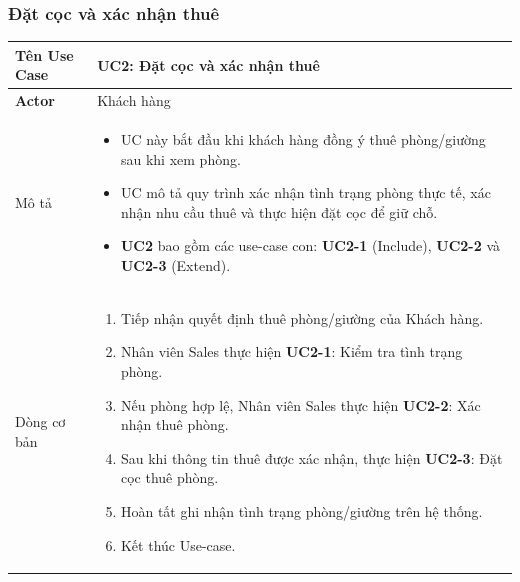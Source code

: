 \subsubsection{Đặt cọc và xác nhận thuê}
\noindent
\begin{table}[H]
    \centering
\begin{tabularx}{\textwidth}{|>{\centering\arraybackslash\bfseries}m{3.5cm}|X|}
    \hline
    Tên Use Case & {\centering\textbf{UC2: Đặt cọc và xác nhận thuê}\par} \\ 
    \hline
    
    Actor & Khách hàng \\ 
    \hline

    Mô tả &
    \vspace{0.2cm}
    \begin{itemize}[leftmargin=*, nosep, label=-]
        \item UC này bắt đầu khi khách hàng đồng ý thuê phòng/giường sau khi xem phòng.
        \item UC mô tả quy trình xác nhận tình trạng phòng thực tế, xác nhận nhu cầu thuê và thực hiện đặt cọc để giữ chỗ.
        \item \textbf{UC2} bao gồm các use-case con: \textbf{UC2-1} (Include), \textbf{UC2-2} và \textbf{UC2-3} (Extend).
    \end{itemize} \\ 
    \hline
    
    Dòng cơ bản &
    \vspace{0.2cm}
    \begin{enumerate}[leftmargin=*, nosep]
        \item Tiếp nhận quyết định thuê phòng/giường của Khách hàng.
        \item Nhân viên Sales thực hiện \textbf{UC2-1}: Kiểm tra tình trạng phòng.
        \item Nếu phòng hợp lệ, Nhân viên Sales thực hiện \textbf{UC2-2}: Xác nhận thuê phòng.
        \item Sau khi thông tin thuê được xác nhận, thực hiện \textbf{UC2-3}: Đặt cọc thuê phòng.
        \item Hoàn tất ghi nhận tình trạng phòng/giường trên hệ thống.
        \item Kết thúc Use-case.
    \end{enumerate} \\ 
    \hline
    

\end{tabularx}
\end{table}
